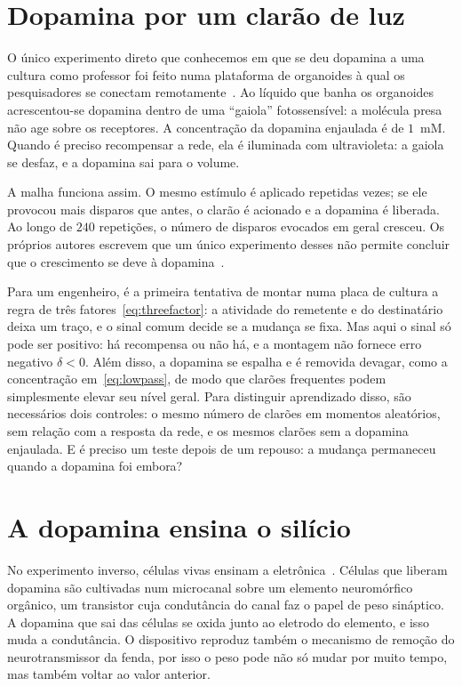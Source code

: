 \section{Dopamina por um clarão de luz}
\label{sec:dishdopamine}

O único experimento direto que conhecemos em que se deu dopamina a uma cultura como professor foi feito numa plataforma de organoides à qual os pesquisadores se conectam remotamente~\cite{Jordan2024}. Ao líquido que banha os organoides acrescentou-se dopamina dentro de uma ``gaiola'' fotossensível: a molécula presa não age sobre os receptores. A concentração da dopamina enjaulada é de $1$~mM. Quando é preciso recompensar a rede, ela é iluminada com ultravioleta: a gaiola se desfaz, e a dopamina sai para o volume.

A malha funciona assim. O mesmo estímulo é aplicado repetidas vezes; se ele provocou mais disparos que antes, o clarão é acionado e a dopamina é liberada. Ao longo de $240$ repetições, o número de disparos evocados em geral cresceu. Os próprios autores escrevem que um único experimento desses não permite concluir que o crescimento se deve à dopamina~\cite{Jordan2024}.

Para um engenheiro, é a primeira tentativa de montar numa placa de cultura a regra de três fatores~\eqref{eq:threefactor}: a atividade do remetente e do destinatário deixa um traço, e o sinal comum decide se a mudança se fixa. Mas aqui o sinal só pode ser positivo: há recompensa ou não há, e a montagem não fornece erro negativo $\delta<0$. Além disso, a dopamina se espalha e é removida devagar, como a concentração em~\eqref{eq:lowpass}, de modo que clarões frequentes podem simplesmente elevar seu nível geral. Para distinguir aprendizado disso, são necessários dois controles: o mesmo número de clarões em momentos aleatórios, sem relação com a resposta da rede, e os mesmos clarões sem a dopamina enjaulada. E é preciso um teste depois de um repouso: a mudança permaneceu quando a dopamina foi embora?

\section{A dopamina ensina o silício}
\label{sec:biohybrid}

No experimento inverso, células vivas ensinam a eletrônica~\cite{Keene2020}. Células que liberam dopamina são cultivadas num microcanal sobre um elemento neuromórfico orgânico, um transistor cuja condutância do canal faz o papel de peso sináptico. A dopamina que sai das células se oxida junto ao eletrodo do elemento, e isso muda a condutância. O dispositivo reproduz também o mecanismo de remoção do neurotransmissor da fenda, por isso o peso pode não só mudar por muito tempo, mas também voltar ao valor anterior.

